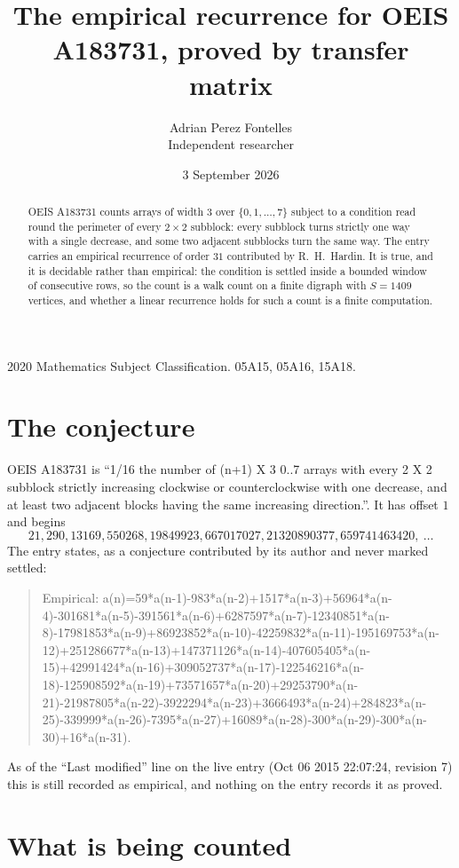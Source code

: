 \documentclass[11pt,a4paper]{article}
\title{The empirical recurrence for OEIS A183731, proved by transfer matrix}
\author{Adrian Perez Fontelles\\ \small Independent researcher}
\date{3 September 2026}
\theoremstyle{plain}
\theoremstyle{definition}
\begin{document}
\maketitle

\begin{abstract}
OEIS A183731 counts arrays of width $3$ over $\{0,1,\dots,7\}$ subject to a condition read round the
perimeter of every $2\times2$ subblock: every subblock turns strictly one way with a single decrease, and some two adjacent subblocks turn the same way. The entry carries an empirical recurrence of
order $31$ contributed by R.~H.~Hardin. It is true, and it is decidable rather than
empirical: the condition is settled inside a bounded window of consecutive rows, so the
count is a walk count on a finite digraph with $S=1409$ vertices, and whether a linear
recurrence holds for such a count is a finite computation.
\end{abstract}

\noindent\small 2020 Mathematics Subject Classification. 05A15, 05A16, 15A18.\normalsize

\section{The conjecture}

OEIS A183731 is ``1/16 the number of (n+1) X 3 0..7 arrays with every 2 X 2 subblock strictly increasing clockwise or counterclockwise with one decrease, and at least two adjacent blocks having the same increasing direction.''. It has offset $1$ and begins
\[
21, 290, 13169, 550268, 19849923, 667017027, 21320890377, 659741463420,\ \dots
\]
The entry states, as a conjecture contributed by its author and never marked settled:
\begin{quote}
Empirical: a(n)=59*a(n-1)-983*a(n-2)+1517*a(n-3)+56964*a(n-4)-301681*a(n-5)-391561*a(n-6)+6287597*a(n-7)-12340851*a(n-8)-17981853*a(n-9)+86923852*a(n-10)-42259832*a(n-11)-195169753*a(n-12)+251286677*a(n-13)+147371126*a(n-14)-407605405*a(n-15)+42991424*a(n-16)+309052737*a(n-17)-122546216*a(n-18)-125908592*a(n-19)+73571657*a(n-20)+29253790*a(n-21)-21987805*a(n-22)-3922294*a(n-23)+3666493*a(n-24)+284823*a(n-25)-339999*a(n-26)-7395*a(n-27)+16089*a(n-28)-300*a(n-29)-300*a(n-30)+16*a(n-31).
\end{quote}
As of the ``Last modified'' line on the live entry (Oct 06 2015 22:07:24, revision 7) this is still
recorded as empirical, and nothing on the entry records it as proved.

\section{What is being counted}
\end{document}
